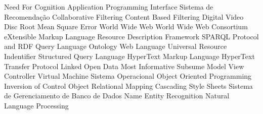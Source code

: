 \begin{acronym}[ACRONYM] 

 {Need For Cognition}
 {Application Programming Interface}
 {Sistema de Recomendação}
 {Collaborative Filtering}
 {Content Based Filtering}
 {Digital Video Disc}
 {Root Mean Square Error}
 {World Wide Web}
 {World Wide Web Consortium}
 {eXtensible Markup Language}
 {Resource Description Framework}
 {SPARQL Protocol and RDF Query Language}
 {Ontology Web Language}
 {Universal Resource Indentifier}
 {Structured Query Language}
 {HyperText Markup Language}
 {HyperText Transfer Protocol}
 {Linked Open Data}
 {Most Informative Subsume}
 {Model View Controller}
 {Virtual Machine}
 {Sistema Operacional}
 {Object Oriented Programming}
 {Inversion of Control}
 {Object Relational Mapping}
 {Cascading Style Sheets}
 {Sistema de Gerenciamento de Banco de Dados}
 {Name Entity Recognition}
 {Natural Language Processing}
    
\end{acronym}